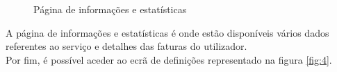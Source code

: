 \begin{figure}[ht!]
\centering
{}
\caption{Página de informações e estatísticas}
\label{fig:3}
\end{figure}

A página de informações e estatísticas é onde estão disponíveis vários dados referentes ao serviço e detalhes das faturas do utilizador.\\ 
Por fim, é possível aceder ao ecrã de definições representado na figura \ref{fig:4}.

\vspace{1cm}

